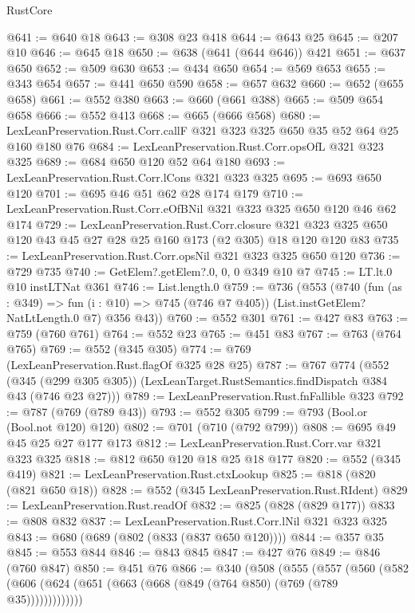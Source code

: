 \begin{lexlean}{RustCore}
\begin{coremodule}
@641 := @640 @18
@643 := @308 @23 @418
@644 := @643 @25
@645 := @207 @10
@646 := @645 @18
@650 := @638 (@641 (@644 @646)) @421
@651 := @637 @650
@652 := @509 @630
@653 := @434 @650
@654 := @569 @653
@655 := @343 @654
@657 := @441 @650 @590
@658 := @657 @632
@660 := @652 (@655 @658)
@661 := @552 @380
@663 := @660 (@661 @388)
@665 := @509 @654 @658
@666 := @552 @413
@668 := @665 (@666 @568)
@680 := LexLeanPreservation.Rust.Corr.callF @321 @323 @325 @650 @35 @52 @64 @25 @160 @180 @76
@684 := LexLeanPreservation.Rust.Corr.opsOfL @321 @323 @325
@689 := @684 @650 @120 @52 @64 @180
@693 := LexLeanPreservation.Rust.Corr.lCons @321 @323 @325
@695 := @693 @650 @120
@701 := @695 @46 @51 @62 @28 @174 @179
@710 := LexLeanPreservation.Rust.Corr.eOfBNil @321 @323 @325 @650 @120 @46 @62 @174
@729 := LexLeanPreservation.Rust.Corr.closure
    @321
    @323
    @325
    @650
    @120
    @43
    @45
    @27
    @28
    @25
    @160
    @173
    (@2 @305)
    @18
    @120
    @120
    @83
@735 := LexLeanPreservation.Rust.Corr.opsNil @321 @323 @325 @650 @120
@736 := @729 @735
@740 := GetElem?.getElem?.{0, 0, 0} @349 @10 @7
@745 := LT.lt.{0} @10 instLTNat @361
@746 := List.length.{0}
@759 := @736
    (@553
      (@740
        (fun (as : @349) => fun (i : @10) => @745 (@746 @7 @405))
        (List.instGetElem?NatLtLength.{0} @7)
        @356
        @43))
@760 := @552 @301
@761 := @427 @83
@763 := @759 (@760 @761)
@764 := @552 @23
@765 := @451 @83
@767 := @763 (@764 @765)
@769 := @552 (@345 @305)
@774 := @769 (LexLeanPreservation.Rust.flagOf @325 @28 @25)
@787 := @767
    @774
    (@552
      (@345 (@299 @305 @305))
      (LexLeanTarget.RustSemantics.findDispatch @384 @43 (@746 @23 @27)))
@789 := LexLeanPreservation.Rust.fnFallible @323
@792 := @787 (@769 (@789 @43))
@793 := @552 @305
@799 := @793 (Bool.or (Bool.not @120) @120)
@802 := @701 (@710 (@792 @799))
@808 := @695 @49 @45 @25 @27 @177 @173
@812 := LexLeanPreservation.Rust.Corr.var @321 @323 @325
@818 := @812 @650 @120 @18 @25 @18 @177
@820 := @552 (@345 @419)
@821 := LexLeanPreservation.Rust.ctxLookup
@825 := @818 (@820 (@821 @650 @18))
@828 := @552 (@345 LexLeanPreservation.Rust.RIdent)
@829 := LexLeanPreservation.Rust.readOf
@832 := @825 (@828 (@829 @177))
@833 := @808 @832
@837 := LexLeanPreservation.Rust.Corr.lNil @321 @323 @325
@843 := @680 (@689 (@802 (@833 (@837 @650 @120))))
@844 := @357 @35
@845 := @553 @844
@846 := @843 @845
@847 := @427 @76
@849 := @846 (@760 @847)
@850 := @451 @76
@866 := @340
    (@508
      (@555
        (@557
          (@560 (@582 (@606 (@624 (@651 (@663 (@668 (@849 (@764 @850) (@769 (@789 @35)))))))))))))

\end{coremodule}
\end{lexlean}
